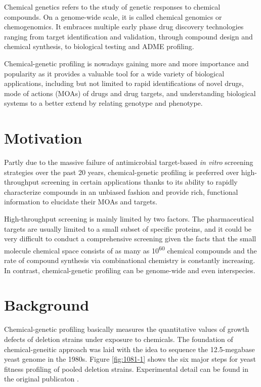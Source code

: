 \documentclass[12pt,conference,compsocconf]{article}
\begin{document}
Chemical genetics refers to the study of genetic responses to chemical compounds. On a genome-wide scale, it is called chemical genomics or chemogenomics. It embraces multiple early phase drug discovery technologies ranging from target identification and validation, through compound design and chemical synthesis, to biological testing and ADME profiling.

Chemical-genetic profiling is nowadays gaining more and more importance and popularity as it provides a valuable tool for a wide variety of biological applications, including but not limited to rapid identifications of novel drugs, mode of actions (MOAs) of drugs and drug targets, and understanding biological systems to a better extend by relating genotype and phenotype.

\section{Motivation}

Partly due to the massive failure of antimicrobial target-based \textit{in vitro} screening strategies over the past 20 years, chemical-genetic profiling is preferred over high-throughput screening in certain applications thanks to its ability to rapidly characterize compounds in an unbiased fashion and provide rich, functional information to elucidate their MOAs and targets.

High-throughput screening is mainly limited by two factors. The pharmaceutical targets are usually limited to a small subset of specific proteins, and it could be very difficult to conduct a comprehensive screening given the facts that the small molecule chemical space consists of as many as 10\textsuperscript{60} chemical compounds \citep{1104} and the rate of compound synthesis via combinational chemistry is constantly increasing. In contrast, chemical-genetic profiling can be genome-wide and even interspecies.

\section{Background}

Chemical-genetic profiling basically measures the quantitative values of growth defects of deletion strains under exposure to chemicals. The foundation of chemical-geneitic approach was laid with the idea to sequence the 12.5-megabase yeast genome in the 1980s. Figure \ref{fig:1081-1} shows the six major steps for yeast fitness profiling of pooled deletion strains. Experimental detail can be found in the original publicaton \citep{1081}.
\end{document}

